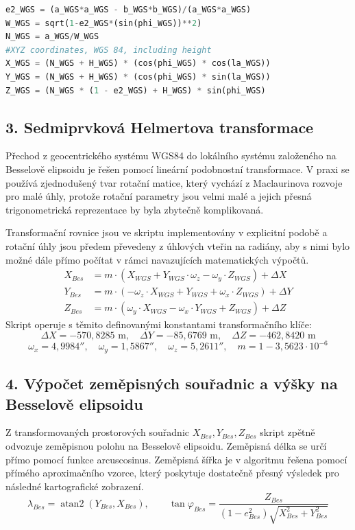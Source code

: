 \begin{lstlisting}[language=Python, caption={Ukázka scriptu pro převod zadaných souřadnic do 3D}]
e2_WGS = (a_WGS*a_WGS - b_WGS*b_WGS)/(a_WGS*a_WGS)
W_WGS = sqrt(1-e2_WGS*(sin(phi_WGS))**2)
N_WGS = a_WGS/W_WGS
#XYZ coordinates, WGS 84, including height
X_WGS = (N_WGS + H_WGS) * (cos(phi_WGS) * cos(la_WGS))
Y_WGS = (N_WGS + H_WGS) * (cos(phi_WGS) * sin(la_WGS))
Z_WGS = (N_WGS * (1 - e2_WGS) + H_WGS) * sin(phi_WGS)
\end{lstlisting}


\subsection*{3. Sedmiprvková Helmertova transformace}
Přechod z geocentrického systému WGS84 do lokálního systému založeného na Besselově elipsoidu je řešen pomocí lineární podobnostní transformace. V praxi se používá zjednodušený tvar rotační matice, který vychází z Maclaurinova rozvoje pro malé úhly, protože rotační parametry jsou velmi malé a jejich přesná trigonometrická reprezentace by byla zbytečně komplikovaná.

Transformační rovnice jsou ve skriptu implementovány v explicitní podobě a rotační úhly jsou předem převedeny z úhlových vteřin na radiány, aby s nimi bylo možné dále přímo počítat v rámci navazujících matematických výpočtů.
\begin{align*}
X_{Bes} &= m \cdot (X_{WGS} + Y_{WGS} \cdot \omega_z - \omega_y \cdot Z_{WGS}) + \Delta X \\
Y_{Bes} &= m \cdot (-\omega_z \cdot X_{WGS} + Y_{WGS} + \omega_x \cdot Z_{WGS}) + \Delta Y \\
Z_{Bes} &= m \cdot (\omega_y \cdot X_{WGS} - \omega_x \cdot Y_{WGS} + Z_{WGS}) + \Delta Z
\end{align*}
Skript operuje s těmito definovanými konstantami transformačního klíče:
$$\Delta X = -570,8285\text{ m}, \quad \Delta Y = -85,6769\text{ m}, \quad \Delta Z = -462,8420\text{ m}$$
$$\omega_x = 4,9984'', \quad \omega_y = 1,5867'', \quad \omega_z = 5,2611'', \quad m = 1 - 3,5623 \cdot 10^{-6}$$

\subsection*{4. Výpočet zeměpisných souřadnic a výšky na Besselově elipsoidu}
Z transformovaných prostorových souřadnic $X_{Bes}, Y_{Bes}, Z_{Bes}$ skript zpětně odvozuje zeměpisnou polohu na Besselově elipsoidu. Zeměpisná délka se určí přímo pomocí funkce arcuscosinus. Zeměpisná šířka je v algoritmu řešena pomocí přímého aproximačního vzorce, který poskytuje dostatečně přesný výsledek pro následné kartografické zobrazení.
\begin{equation*}
\lambda_{Bes} = \operatorname{atan2}(Y_{Bes}, X_{Bes}), \qquad \tan \varphi_{Bes} = \frac{Z_{Bes}}{(1 - e^2_{Bes})\sqrt{X_{Bes}^2 + Y_{Bes}^2}}
\end{equation*}

